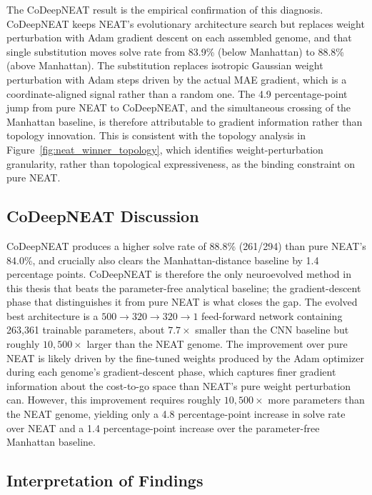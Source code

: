 The CoDeepNEAT result is the empirical confirmation of this diagnosis. CoDeepNEAT
keeps NEAT's evolutionary architecture search but replaces weight perturbation with
Adam gradient descent on each assembled genome, and that single substitution moves
solve rate from 83.9\% (below Manhattan) to 88.8\% (above Manhattan). The substitution replaces isotropic Gaussian weight perturbation with Adam steps
driven by the actual MAE gradient, which is a coordinate-aligned signal rather
than a random one. The 4.9 percentage-point jump from pure NEAT to
CoDeepNEAT, and the simultaneous crossing of the Manhattan baseline, is therefore
attributable to gradient information rather than topology innovation. This is
consistent with the topology analysis in Figure~\ref{fig:neat_winner_topology},
which identifies weight-perturbation granularity, rather than topological
expressiveness, as the binding constraint on pure NEAT.

\subsection{CoDeepNEAT Discussion}
CoDeepNEAT produces a higher solve rate of 88.8\% (261/294) than pure NEAT's 84.0\%, and crucially also clears the Manhattan-distance baseline by 1.4 percentage points. CoDeepNEAT is therefore the only neuroevolved method in this thesis that beats the parameter-free analytical baseline; the gradient-descent phase that distinguishes it from pure NEAT is what closes the gap. The evolved best architecture is a $500 \to 320 \to 320 \to 1$ feed-forward network containing 263{,}361 trainable parameters, about $7.7\times$ smaller than the CNN baseline but roughly $10{,}500\times$ larger than the NEAT genome. The improvement over pure NEAT is likely driven by the fine-tuned weights produced by the Adam optimizer during each genome's gradient-descent phase, which captures finer gradient information about the cost-to-go space than NEAT's pure weight perturbation can. However, this improvement requires roughly $10{,}500\times$ more parameters than the NEAT genome, yielding only a 4.8 percentage-point increase in solve rate over NEAT and a 1.4 percentage-point increase over the parameter-free Manhattan baseline.

\subsection{Interpretation of Findings}


